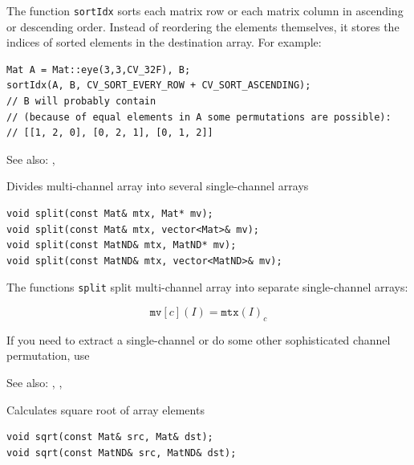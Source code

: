 The function \texttt{sortIdx} sorts each matrix row or each matrix column in ascending or descending order. Instead of reordering the elements themselves, it stores the indices of sorted elements in the destination array. For example:

\begin{lstlisting}
Mat A = Mat::eye(3,3,CV_32F), B;
sortIdx(A, B, CV_SORT_EVERY_ROW + CV_SORT_ASCENDING);
// B will probably contain
// (because of equal elements in A some permutations are possible):
// [[1, 2, 0], [0, 2, 1], [0, 1, 2]]
\end{lstlisting}

See also: , 

\label{split}
Divides multi-channel array into several single-channel arrays

\begin{lstlisting}
void split(const Mat& mtx, Mat* mv);
void split(const Mat& mtx, vector<Mat>& mv);
void split(const MatND& mtx, MatND* mv);
void split(const MatND& mtx, vector<MatND>& mv);
\end{lstlisting}
\begin{description}
\end{description}

The functions \texttt{split} split multi-channel array into separate single-channel arrays:

\[ \texttt{mv}[c](I) = \texttt{mtx}(I)_c \]

If you need to extract a single-channel or do some other sophisticated channel permutation, use 

See also: , , 

\label{sqrt}
Calculates square root of array elements

\begin{lstlisting}
void sqrt(const Mat& src, Mat& dst);
void sqrt(const MatND& src, MatND& dst);
\end{lstlisting}
\begin{description}
\end{description}

